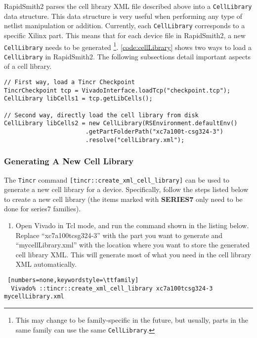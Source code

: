 RapidSmith2 parses the cell library XML file described above into a
\texttt{CellLibrary} data structure. This data structure is very useful when
performing any type of netlist manipulation or addition. Currently, each \texttt{CellLibrary}
corresponds to a specific Xilinx part. This means that for each device file in
RapidSmith2, a new \texttt{CellLibrary} needs to be generated \footnote{This may
change to be family-specific in the future, but usually, parts in the same
family can use the same \texttt{CellLibrary}.}. \autoref{code:cellLibrary}
shows two ways to load a \texttt{CellLibrary} in RapidSmith2. The following
subsections detail important aspects of a cell library.

\begin{lstlisting}[xleftmargin=1.5em, framexleftmargin=1.5em, caption=
Loading a CellLibrary in RapidSmith2, label=code:cellLibrary] 
// First way, load a Tincr Checkpoint
TincrCheckpoint tcp = VivadoInterface.loadTcp("checkpoint.tcp");
CellLibrary libCells1 = tcp.getLibCells();

// Second way, directly load the cell library from disk
CellLibrary libCells2 = new CellLibrary(RSEnvironment.defaultEnv()
                       .getPartFolderPath("xc7a100t-csg324-3")
                       .resolve("cellLibrary.xml");
\end{lstlisting} 

\subsubsection{Generating A New Cell Library} \label{sec:cellLibraryGeneration}
The \texttt{Tincr} command \texttt{[tincr::create\_xml\_cell\_library]} can be
used to generate a new cell library for a device. Specifically, follow the steps
listed below to create a new cell library (the items marked with
\textbf{SERIES7} only need to be done for series7 families).

\begin{enumerate}
  \item Open Vivado in Tcl mode, and run the command shown in the listing below.
  Replace ``xc7a100tcsg324-3'' with the part you want to generate and
  ``mycellLibrary.xml'' with the location where you want to store the generated
  cell library XML. This will generate most of what you need in the cell
  library XML automatically.
\end{enumerate}

  \begin{lstlisting} [numbers=none,keywordstyle=\ttfamily]
  Vivado% ::tincr::create_xml_cell_library xc7a100tcsg324-3 mycellLibrary.xml
  \end{lstlisting}

